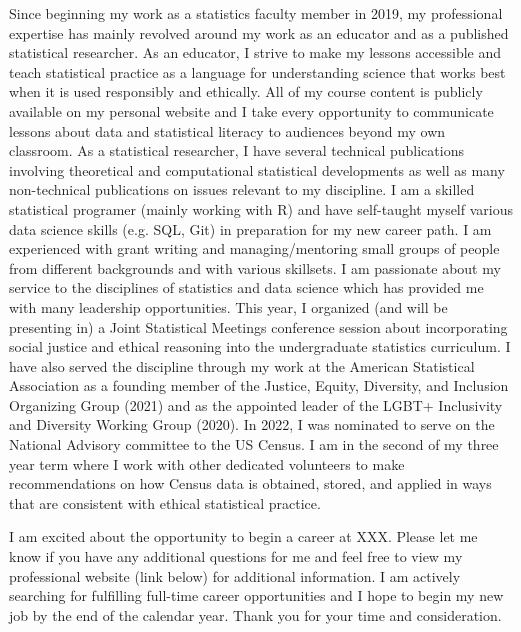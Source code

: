 \documentclass[11pt,a4paper,sans]{moderncv}
\begin{document}
Since beginning my work as a statistics faculty member in 2019, my professional expertise has mainly revolved around my work as an educator and as a published statistical researcher. As an educator, I strive to make my lessons accessible and teach statistical practice as a language for understanding science that works best when it is used responsibly and ethically. All of my course content is publicly available on my personal website and I take every opportunity to communicate lessons about data and statistical literacy to audiences beyond my own classroom. As a statistical researcher, I have several technical publications involving theoretical and computational statistical developments as well as many non-technical publications on issues relevant to my discipline. I am a skilled statistical programer (mainly working with R) and have self-taught myself various data science skills (e.g. SQL, Git) in preparation for my new career path. I am experienced with grant writing and managing/mentoring small groups of people from different backgrounds and with various skillsets. %
I am passionate about my service to the disciplines of statistics and data science which has provided me with many leadership opportunities. This year, I organized (and will be presenting in) a Joint Statistical Meetings conference session about incorporating social justice and ethical reasoning into the undergraduate statistics curriculum. I have also served the discipline through my work at the American Statistical Association as a founding member of the Justice, Equity, Diversity, and Inclusion Organizing Group (2021) and as the appointed leader of the LGBT+ Inclusivity and Diversity Working Group (2020). In 2022, I was nominated to serve on the National Advisory committee to the US Census. I am in the second of my three year term where I work with other dedicated volunteers to make recommendations on how Census data is obtained, stored, and applied in ways that are consistent with ethical statistical practice.   
	
	
	\vspace{.5cm} 
	
	I am excited about the opportunity to begin a career at XXX. Please let me know if you have any additional questions for me and feel free to view my professional website (link below) for additional information. I am actively searching for fulfilling full-time career opportunities and I hope to begin my new job by the end of the calendar year. Thank you for your time and consideration.\\
	
	\vspace{1cm}
	
	\makeletterclosing
	
\end{document}
